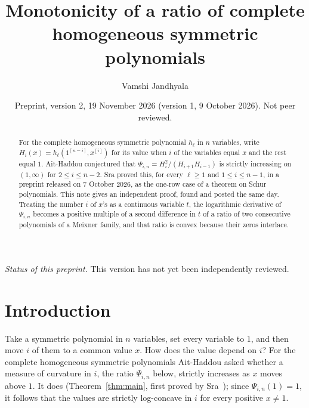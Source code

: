 \documentclass[11pt]{amsart}
\title[A ratio of complete homogeneous symmetric polynomials]{Monotonicity of a ratio of complete homogeneous symmetric polynomials}
\author{Vamshi Jandhyala}
\date{Preprint, version 2, 19 November 2026 (version 1, 9 October 2026). Not peer reviewed.}
\theoremstyle{remark}
\begin{document}
\begin{abstract}
For the complete homogeneous symmetric polynomial $h_\ell$ in $n$ variables, write $H_i(x)=h_\ell(1^{[n-i]},x^{[i]})$ for its value when $i$ of the variables equal $x$ and the rest equal $1$. Ait-Haddou conjectured that $\Psi_{i,n}=H_i^2/(H_{i+1}H_{i-1})$ is strictly increasing on $(1,\infty)$ for $2\le i\le n-2$. Sra proved this, for every $\ell\ge1$ and $1\le i\le n-1$, in a preprint released on 7 October 2026, as the one-row case of a theorem on Schur polynomials. This note gives an independent proof, found and posted the same day. Treating the number $i$ of $x$'s as a continuous variable $t$, the logarithmic derivative of $\Psi_{i,n}$ becomes a positive multiple of a second difference in $t$ of a ratio of two consecutive polynomials of a Meixner family, and that ratio is convex because their zeros interlace.
\end{abstract}

\maketitle

\noindent\emph{Status of this preprint.} This version has not yet been independently reviewed.

\section{Introduction}

Take a symmetric polynomial in $n$ variables, set every variable to $1$, and then move $i$ of them to a common value $x$. How does the value depend on $i$? For the complete homogeneous symmetric polynomials Ait-Haddou asked whether a measure of curvature in $i$, the ratio $\Psi_{i,n}$ below, strictly increases as $x$ moves above $1$. It does (Theorem~\ref{thm:main}, first proved by Sra~\cite{SraT}); since $\Psi_{i,n}(1)=1$, it follows that the values are strictly log-concave in $i$ for every positive $x\ne1$.
\end{document}
